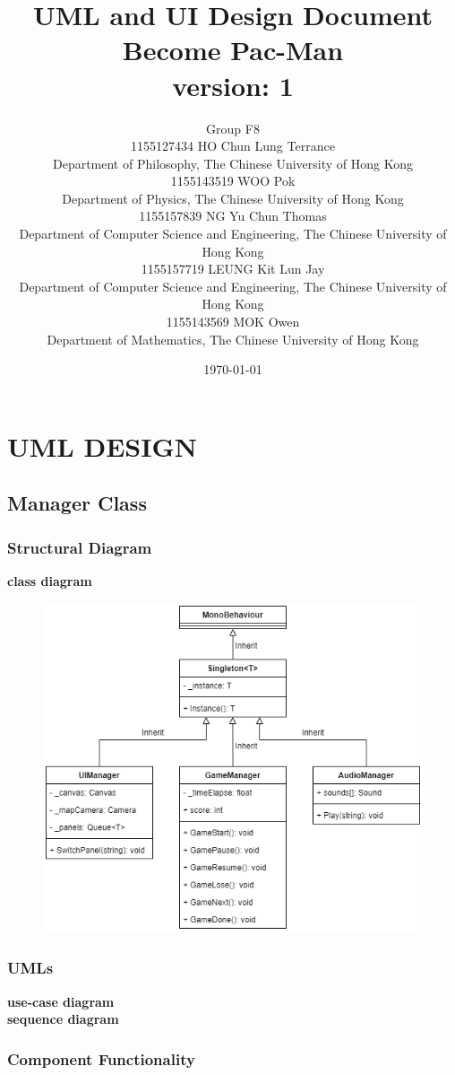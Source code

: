 \documentclass[11pt]{article}
\title{UML and UI Design Document\\Become Pac-Man\\version: 1}
\author{Group F8\\1155127434 HO Chun Lung Terrance\\
Department of Philosophy, The Chinese University of Hong Kong\\1155143519 WOO Pok\\
Department of Physics, The Chinese University of Hong Kong\\1155157839 NG Yu Chun Thomas\\
Department of Computer Science and Engineering, The Chinese University of Hong Kong\\1155157719 LEUNG Kit Lun Jay\\
Department of Computer Science and Engineering, The Chinese University of Hong Kong\\1155143569 MOK Owen\\
Department of Mathematics, The Chinese University of Hong Kong}
\date{\today}
\begin{document}
\maketitle
\tableofcontents
\newpage
\section{UML DESIGN}

\subsection{Manager Class}
\subsubsection{Structural Diagram}
\textbf{class diagram}\\
\begin{figure}[H]
    \centering
    \includegraphics*[scale=0.4]{UML-Class-Singleton.png}
\end{figure}
\subsubsection{UMLs}
\textbf{use-case diagram}\\
\textbf{sequence diagram}\\
\subsubsection{Component Functionality}
\end{document}

